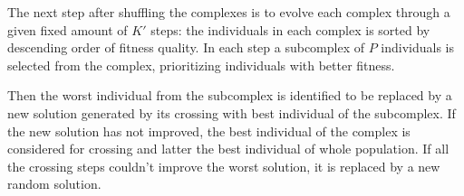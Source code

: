 \nocite{duan1992effective}
The next step after shuffling the complexes is to evolve each complex through
a given fixed amount of $K'$ steps:
the individuals in each complex is sorted by descending order of fitness quality.
In each step a subcomplex of $P$ individuals is selected from the
complex, prioritizing individuals with better fitness.

Then the worst individual from the subcomplex is identified to
be replaced by a new solution generated by its crossing 
with best individual of the subcomplex.
If the new solution has not improved, the best individual
of the complex is considered for crossing and latter the best individual
of whole population.
If all the crossing steps couldn't improve the worst solution,
it is replaced by a new random solution.
